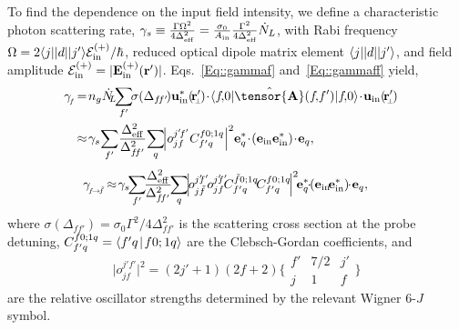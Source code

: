 \documentclass[aps,pra,twocolumn]{revtex4-1} %
\newcommand{\inp}{{\rm in}}
\begin{document}
\begin{appendix}
To find the dependence on the input field intensity, we define a characteristic photon scattering rate, $\gamma_s \equiv \frac{\Gamma\Omega^2}{4\Delta_{\rm eff}^2}= \frac{\sigma_0}{A_{\rm in}}\frac{\Gamma^2}{4 \Delta_\eff^2} \dot{N}_L $, with Rabi frequency $ \Omega=2\bra{j}|d|\ket{j'}\mathcal{E}^{(+)}_{\rm in}/\hbar $, reduced optical dipole matrix element $\bra{j}|d|\ket{j'}$, and field amplitude $ \mathcal{E}^{(+)}_{\rm in}=|\mathbf{E}_{\rm in}^{(+)}(\br')| $.
Eqs.~\eqref{Eq::gammaf} and~\eqref{Eq::gammaff} yield,
\begin{subequations}
	\begin{align}
		\!\!\!\!\!\!\!\!\!\!\!\!\!\!\!\!\!\!\!\!\!\!\!\!\!\gamma\!_{_f} &\!=\!n_g\dot{N}\!\!_L  \!\!\sum_{f'}\!\! \sigma (\Delta_{f\!f'} \!) \mathbf{u}^*_\inp(\!\br'\!\!\!_{_\perp}\!)\!\cdot\! \bra{f\!,\!0} \hat{\tensor{\mbf{A}}}(f\!,\!f') \ket{f\!,\!0} \! \cdot\! \mathbf{u}_\inp(\!\br'\!\!\!_{_\perp}\!)\\
		&\!\approx\!  \gamma_s\! \sum_{f'}\! \frac{\Delta_{\rm eff}^2}{\Delta_{f\!f'}^2}\!\sum_q\!\! \left| o_{jf}^{j'\!f'}C_{f'q}^{f0;1 q}\right|^2\! \mathbf{e}_q^* \!\cdot\! (\mathbf{e}_{\rm in}\mathbf{e}_{\rm in}^* )\!\cdot\! \mathbf{e}_q, 
	\end{align}
\end{subequations}
	\begin{align}
		\!\!\!\!\!\gamma\!_{_{f \!\rightarrow\! \tilde{f}}} 
		&\!\approx\! \gamma_s \!\!\sum_{f'}\!\! \frac{\Delta_{\rm eff}^2}{\Delta_{f\!f'}^2}\!\!\sum_q\!\! \left|\! o_{j\tilde{f}}^{j'\!\!f'}\! o_{jf}^{j'\!\!f'}\!\!C_{f'q}^{\tilde{f}0;1 q} \!C_{f'q}^{f0;1q} \!\right|^2 \!\! \mathbf{e}_q^* \!\!\cdot\!\! (\mathbf{e}_{\rm in}\!\mathbf{e}_{\rm in}^* )\!\!\cdot\! \mathbf{e}_q,
	\end{align}
where $ \sigma (\Delta_{f\!f'} ) \! =\! \sigma_0 \Gamma^2\!/\!4\Delta^2_{f\!f'}$ is the scattering cross section at the probe detuning, $ C_{f'q}^{f0;1 q}=\Braket{f'q}{f0;1q}$ are the Clebsch-Gordan coefficients, and
\begin{equation}
\big| o_{jf}^{j'f'} \big|^2=(2j'+1)(2f+2) \bigg\{
\begin{array}{ccc}
f' & 7/2 & j' \\
 j & 1 & f 
 \end{array}
 \bigg\}
\end{equation}
are the relative oscillator strengths determined by the relevant Wigner 6-$J$ symbol.


\end{appendix}
\end{document}
